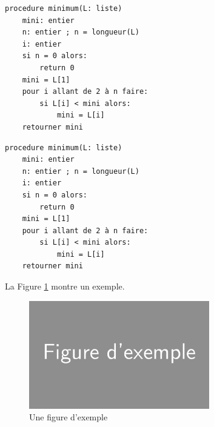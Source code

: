 \begin{lstlisting}[language=Pseudo-code, caption=Recherche du minimum dans une liste]
procedure minimum(L: liste)
	mini: entier
	n: entier ; n = longueur(L)
	i: entier
	si n = 0 alors:
		return 0
	mini = L[1]
	pour i allant de 2 à n faire:
		si L[i] < mini alors:
			mini = L[i]
	retourner mini
\end{lstlisting}

\begin{lstlisting}[language=Pseudo-code]
procedure minimum(L: liste)
	mini: entier
	n: entier ; n = longueur(L)
	i: entier
	si n = 0 alors:
		return 0
	mini = L[1]
	pour i allant de 2 à n faire:
		si L[i] < mini alors:
			mini = L[i]
	retourner mini
\end{lstlisting}

\lipsum[3]

\vspace{1em}

La Figure \ref{exemple} montre un exemple.

\begin{figure}[H]
\centering
\includegraphics[width=0.7\textwidth]{images/figure_dexemple.png}
\caption{Une figure d'exemple}
\label{exemple}
\end{figure}

\lipsum[4]
\lipsum[5]

\vspace{1em}

\lipsum[6]


